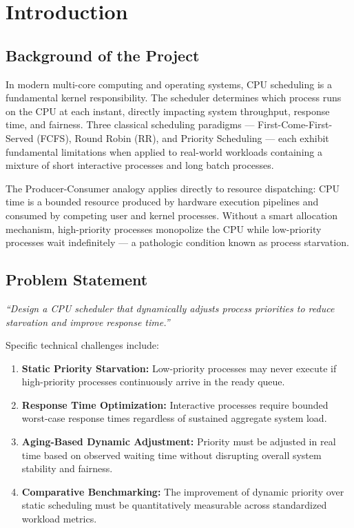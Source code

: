 \documentclass[12pt,a4paper]{report}
\begin{document}
\chapter{Introduction}\label{ch1}

\section{Background of the Project}
In modern multi-core computing and operating systems, CPU scheduling is a fundamental kernel responsibility. The scheduler determines which process runs on the CPU at each instant, directly impacting system throughput, response time, and fairness. Three classical scheduling paradigms --- First-Come-First-Served (FCFS), Round Robin (RR), and Priority Scheduling --- each exhibit fundamental limitations when applied to real-world workloads containing a mixture of short interactive processes and long batch processes.

The Producer-Consumer analogy applies directly to resource dispatching: CPU time is a bounded resource produced by hardware execution pipelines and consumed by competing user and kernel processes. Without a smart allocation mechanism, high-priority processes monopolize the CPU while low-priority processes wait indefinitely --- a pathologic condition known as process starvation.

\section{Problem Statement}
\begin{center}
\textit{``Design a CPU scheduler that dynamically adjusts process priorities to reduce starvation and improve response time.''}
\end{center}

Specific technical challenges include:
\begin{enumerate}[leftmargin=1.8em, itemsep=2pt]
  \item \textbf{Static Priority Starvation:} Low-priority processes may never execute if high-priority processes continuously arrive in the ready queue.
  \item \textbf{Response Time Optimization:} Interactive processes require bounded worst-case response times regardless of sustained aggregate system load.
  \item \textbf{Aging-Based Dynamic Adjustment:} Priority must be adjusted in real time based on observed waiting time without disrupting overall system stability and fairness.
  \item \textbf{Comparative Benchmarking:} The improvement of dynamic priority over static scheduling must be quantitatively measurable across standardized workload metrics.
\end{enumerate}
\end{document}
